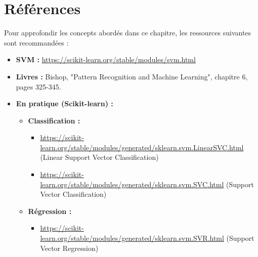 \documentclass{article}
\begin{document}
\section{Références}
Pour approfondir les concepts abordés dans ce chapitre, les ressources suivantes sont recommandées :
\begin{itemize}
    \item \textbf{SVM :} \url{https://scikit-learn.org/stable/modules/svm.html}
    \item \textbf{Livres :} Bishop, "Pattern Recognition and Machine Learning", chapitre 6, pages 325-345.
    \item \textbf{En pratique (Scikit-learn) :}
    \begin{itemize}
        \item \textbf{Classification :}
        \begin{itemize}
            \item \url{https://scikit-learn.org/stable/modules/generated/sklearn.svm.LinearSVC.html} (Linear Support Vector Classification)
            \item \url{https://scikit-learn.org/stable/modules/generated/sklearn.svm.SVC.html} (Support Vector Classification)
        \end{itemize}
        \item \textbf{Régression :}
        \begin{itemize}
            \item \url{https://scikit-learn.org/stable/modules/generated/sklearn.svm.SVR.html} (Support Vector Regression)
        \end{itemize}
    \end{itemize}
\end{itemize}
\end{document}
